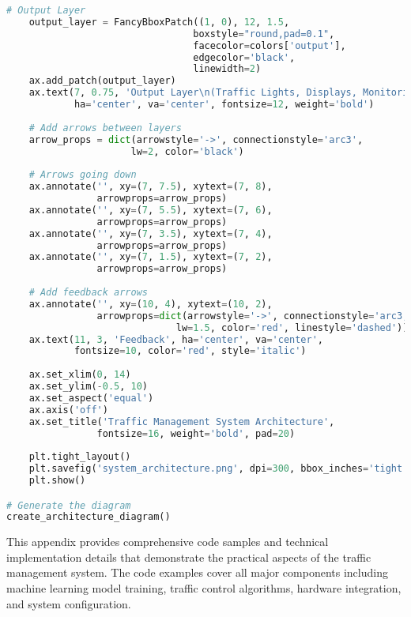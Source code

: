 \begin{lstlisting}[language=Python, caption=System Architecture Visualization]
    # Output Layer
    output_layer = FancyBboxPatch((1, 0), 12, 1.5,
                                 boxstyle="round,pad=0.1",
                                 facecolor=colors['output'],
                                 edgecolor='black',
                                 linewidth=2)
    ax.add_patch(output_layer)
    ax.text(7, 0.75, 'Output Layer\n(Traffic Lights, Displays, Monitoring Dashboard)', 
            ha='center', va='center', fontsize=12, weight='bold')
    
    # Add arrows between layers
    arrow_props = dict(arrowstyle='->', connectionstyle='arc3', 
                      lw=2, color='black')
    
    # Arrows going down
    ax.annotate('', xy=(7, 7.5), xytext=(7, 8),
                arrowprops=arrow_props)
    ax.annotate('', xy=(7, 5.5), xytext=(7, 6),
                arrowprops=arrow_props)
    ax.annotate('', xy=(7, 3.5), xytext=(7, 4),
                arrowprops=arrow_props)
    ax.annotate('', xy=(7, 1.5), xytext=(7, 2),
                arrowprops=arrow_props)
    
    # Add feedback arrows
    ax.annotate('', xy=(10, 4), xytext=(10, 2),
                arrowprops=dict(arrowstyle='->', connectionstyle='arc3,rad=0.3',
                              lw=1.5, color='red', linestyle='dashed'))
    ax.text(11, 3, 'Feedback', ha='center', va='center', 
            fontsize=10, color='red', style='italic')
    
    ax.set_xlim(0, 14)
    ax.set_ylim(-0.5, 10)
    ax.set_aspect('equal')
    ax.axis('off')
    ax.set_title('Traffic Management System Architecture', 
                fontsize=16, weight='bold', pad=20)
    
    plt.tight_layout()
    plt.savefig('system_architecture.png', dpi=300, bbox_inches='tight')
    plt.show()

# Generate the diagram
create_architecture_diagram()
\end{lstlisting}

This appendix provides comprehensive code samples and technical implementation details that demonstrate the practical aspects of the traffic management system. The code examples cover all major components including machine learning model training, traffic control algorithms, hardware integration, and system configuration. 